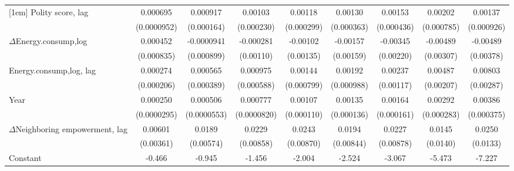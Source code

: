 \begin{table}[htbp]
\begin{tabular}{l*{8}{c}}
[1em]
Polity score, lag           &    0.000695\sym{***}&    0.000917\sym{***}&     0.00103\sym{***}&     0.00118\sym{***}&     0.00130\sym{***}&     0.00153\sym{***}&     0.00202\sym{**} &     0.00137         \\
                    & (0.0000952)         &  (0.000164)         &  (0.000230)         &  (0.000299)         &  (0.000363)         &  (0.000436)         &  (0.000785)         &  (0.000926)         \\
[1em]
$\Delta$Energy.consump,log            &    0.000452         &  -0.0000941         &   -0.000281         &    -0.00102         &    -0.00157         &    -0.00345         &    -0.00489         &    -0.00489         \\
                    &  (0.000835)         &  (0.000899)         &   (0.00110)         &   (0.00135)         &   (0.00159)         &   (0.00220)         &   (0.00307)         &   (0.00378)         \\
[1em]
Energy.consump,log, lag           &    0.000274         &    0.000565         &    0.000975\sym{*}  &     0.00144\sym{*}  &     0.00192\sym{*}  &     0.00237\sym{**} &     0.00487\sym{**} &     0.00803\sym{***}\\
                    &  (0.000206)         &  (0.000389)         &  (0.000588)         &  (0.000799)         &  (0.000988)         &   (0.00117)         &   (0.00207)         &   (0.00287)         \\
[1em]
Year                &    0.000250\sym{***}&    0.000506\sym{***}&    0.000777\sym{***}&     0.00107\sym{***}&     0.00135\sym{***}&     0.00164\sym{***}&     0.00292\sym{***}&     0.00386\sym{***}\\
                    & (0.0000295)         & (0.0000553)         & (0.0000820)         &  (0.000110)         &  (0.000136)         &  (0.000161)         &  (0.000283)         &  (0.000375)         \\
[1em]
$\Delta$Neighboring empowerment, lag&     0.00601\sym{*}  &      0.0189\sym{***}&      0.0229\sym{***}&      0.0243\sym{***}&      0.0194\sym{**} &      0.0227\sym{**} &      0.0145         &      0.0250\sym{*}  \\
                    &   (0.00361)         &   (0.00574)         &   (0.00858)         &   (0.00870)         &   (0.00844)         &   (0.00878)         &    (0.0140)         &    (0.0133)         \\
[1em]
Constant            &      -0.466\sym{***}&      -0.945\sym{***}&      -1.456\sym{***}&      -2.004\sym{***}&      -2.524\sym{***}&      -3.067\sym{***}&      -5.473\sym{***}&      -7.227\sym{***}\\

\end{tabular}
\end{table}
